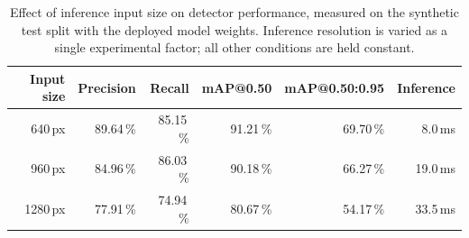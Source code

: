 \begin{table}[htbp]
\centering
\caption{Effect of inference input size on detector performance, measured on the synthetic test split with the deployed model weights. Inference resolution is varied as a single experimental factor; all other conditions are held constant.}
\label{tab:resolution-study}
\begin{tabular}{|r|r|r|r|r|r|}
\hline
\textbf{Input size} & \textbf{Precision} & \textbf{Recall} & \textbf{mAP@0.50} & \textbf{mAP@0.50:0.95} & \textbf{Inference} \\
\hline
640\,px & 89.64\,\% & 85.15\,\% & 91.21\,\% & 69.70\,\% & 8.0\,ms \\
\hline
960\,px & 84.96\,\% & 86.03\,\% & 90.18\,\% & 66.27\,\% & 19.0\,ms \\
\hline
1280\,px & 77.91\,\% & 74.94\,\% & 80.67\,\% & 54.17\,\% & 33.5\,ms \\
\hline
\end{tabular}
\end{table}
